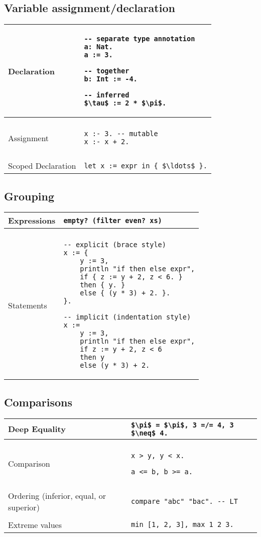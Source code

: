 \documentclass[a4paper,12pt]{article}
\makeatletter
\newcommand{\code}{\lstinline}
\newcommand{\br}{\\ [0.5em] \hline \\ [-0.5em]}
\newenvironment{data}
    {
        \begin{center}
        \begin{tabular*}{\textwidth}{ l@{\extracolsep{\fill}}l }
    }
    {
        \end{tabular*}
        \end{center}
    }
\makeatother
\begin{document}
\subsection{Variable assignment/declaration}
    \begin{data}
        Declaration        & 
            \begin{lstlisting}[mathescape=true]
-- separate type annotation
a: Nat. 
a := 3.

-- together
b: Int := -4. 

-- inferred
$\tau$ := 2 * $\pi$. 
            \end{lstlisting} \br
        Assignment         & 
            \begin{lstlisting}
x :- 3. -- mutable
x :- x + 2. 
            \end{lstlisting} \br
        Scoped Declaration & 
            \code[mathescape=true]|let x := expr in { $\ldots$ }.|
    \end{data}

\subsection{Grouping}
    \begin{data}
        Expressions       & 
            \code|empty? (filter even? xs)| \br
        Statements & 
            \begin{lstlisting}
-- explicit (brace style)
x := { 
    y := 3, 
    println "if then else expr",
    if { z := y + 2, z < 6. }
    then { y. } 
    else { (y * 3) + 2. }.
}.

-- implicit (indentation style)
x :=
    y := 3,
    println "if then else expr",
    if z := y + 2, z < 6 
    then y
    else (y * 3) + 2.
            \end{lstlisting}
    \end{data}

\subsection{Comparisons}
\begin{data}
    Deep Equality  & 
        \code[mathescape=true]
        |$\pi$ = $\pi$, 3 =/= 4, 3 $\neq$ 4.|       \br
    Comparison     &
        \begin{lstlisting}[mathescape=true]
x > y, y < x.

a <= b, b >= a.
        \end{lstlisting} \br
    Ordering (inferior, equal, or superior) &
        \code|compare "abc" "bac". -- LT|    \br
    Extreme values &
        \code|min [1, 2, 3], max 1 2 3.|
\end{data}
\end{document}
